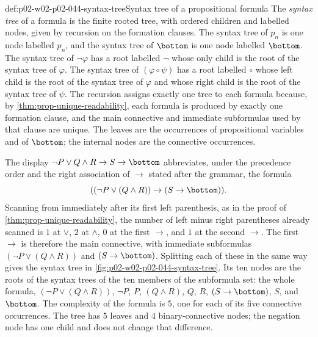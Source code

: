 \begin{hbdefinition}{def:p02-w02-p02-044-syntax-tree}{Syntax tree of a propositional formula}
The \emph{syntax tree} of a formula is the finite rooted tree, with ordered
children and labelled nodes, given by recursion on the formation clauses.
The syntax tree of \(p_n\) is one node labelled \(p_n\), and the syntax tree
of \(\bottom\) is one node labelled \(\bottom\).  The syntax tree of
\(\neg\varphi\) has a root labelled \(\neg\) whose only child is the root of
the syntax tree of \(\varphi\).  The syntax tree of \((\varphi\circ\psi)\) has
a root labelled \(\circ\) whose left child is the root of the syntax tree of
\(\varphi\) and whose right child is the root of the syntax tree of \(\psi\).
The recursion assigns exactly one tree to each formula because, by
\cref{thm:prop-unique-readability}, each formula is produced by exactly one
formation clause, and the main connective and immediate subformulas used by
that clause are unique.  The leaves are the occurrences of propositional
variables and of \(\bottom\); the internal nodes are the connective
occurrences.
\end{hbdefinition}

The display \(\neg P\lor Q\land R\to S\to\bottom\) abbreviates, under the
precedence order and the right association of \(\to\) stated after the
grammar, the formula
\[
  ((\neg P\lor(Q\land R))\to(S\to\bottom)).
\]
Scanning from immediately after its first left parenthesis, as in the proof
of \cref{thm:prop-unique-readability}, the number of left minus right
parentheses already scanned is \(1\) at \(\lor\), \(2\) at \(\land\), \(0\)
at the first \(\to\), and \(1\) at the second \(\to\).  The first \(\to\) is
therefore the main connective, with immediate subformulas
\((\neg P\lor(Q\land R))\) and \((S\to\bottom)\).  Splitting each of these in
the same way gives the syntax tree in \cref{fig:p02-w02-p02-044-syntax-tree}.
Its ten nodes are the roots of the syntax trees of the ten members of the
subformula set: the whole formula, \((\neg P\lor(Q\land R))\), \(\neg P\),
\(P\), \((Q\land R)\), \(Q\), \(R\), \((S\to\bottom)\), \(S\), and
\(\bottom\).  The complexity of the formula is \(5\), one for each of its
five connective occurrences.  The tree has \(5\) leaves and \(4\)
binary-connective nodes; the negation node has one child and does not change
that difference.

